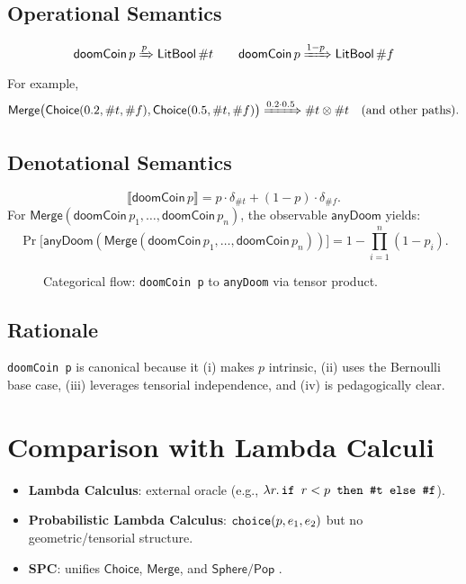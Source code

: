 \documentclass{article}
\newcommand{\Sphere}{\mathsf{Sphere}}
\newcommand{\Pop}{\mathsf{Pop}}
\newcommand{\Merge}{\mathsf{Merge}}
\newcommand{\Choice}{\mathsf{Choice}}
\newcommand{\LitBool}[1]{\mathsf{LitBool}\,#1}
\newcommand{\Dist}{\mathsf{Dist}}
\newcommand{\Bool}{\mathsf{Bool}}
\newcommand{\doomCoin}[1]{\mathsf{doomCoin}\,#1}
\newcommand{\anyDoom}{\mathsf{anyDoom}}
\newcommand{\LongRightarrowp}[1]{\xRightarrow{#1}} %
\newcommand{\mtt}[1]{\text{\texttt{#1}}}
\begin{document}
\subsection{Operational Semantics}
\[
\doomCoin{p} \LongRightarrowp{p} \LitBool{\#t}
\qquad
\doomCoin{p} \LongRightarrowp{1-p} \LitBool{\#f}
\]
For example,
\[
\Merge\bigl(\Choice(0.2, \#t, \#f), \Choice(0.5, \#t, \#f)\bigr)
\LongRightarrowp{0.2\cdot 0.5} \#t \otimes \#t \quad \text{(and other paths)}.
\]

\subsection{Denotational Semantics}
\[
\llbracket \doomCoin{p} \rrbracket = p \cdot \delta_{\#t} + (1-p) \cdot \delta_{\#f}.
\]
For \(\Merge(\doomCoin{p_1}, \ldots, \doomCoin{p_n})\), the observable \(\anyDoom\) yields:
\[
\Pr\!\bigl[\anyDoom(\Merge(\doomCoin{p_1}, \ldots, \doomCoin{p_n}))\bigr]
= 1 - \prod_{i=1}^n (1-p_i).
\]

\begin{figure}[h]
\centering
{}
\caption{Categorical flow: \texttt{doomCoin p} to \texttt{anyDoom} via tensor product.}
\end{figure}

\subsection{Rationale}
\texttt{doomCoin p} is canonical because it (i) makes \(p\) intrinsic, (ii) uses the Bernoulli base case, (iii) leverages tensorial independence, and (iv) is pedagogically clear.

\section{Comparison with Lambda Calculi}
\begin{itemize}
  \item \textbf{Lambda Calculus}: external oracle (e.g., \(\lambda r.\,\mtt{if } r < p \mtt{ then \#t else \#f}\)).
  \item \textbf{Probabilistic Lambda Calculus}: \(\mtt{choice}(p,e_1,e_2)\) but no geometric/tensorial structure.
  \item \textbf{SPC}: unifies \(\Choice\), \(\Merge\), and \(\Sphere/\Pop\) \cite{church1936,kozen1981,milner1992}.
\end{itemize}
\end{document}
